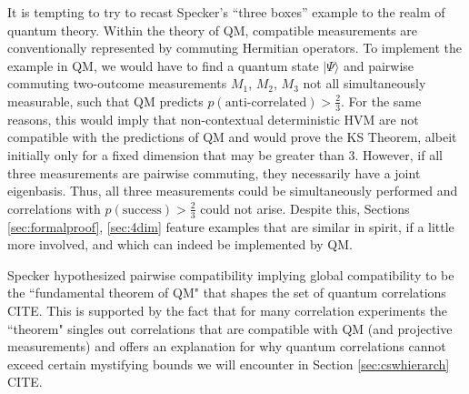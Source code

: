 It is tempting to try to recast Specker's “three boxes” example to the realm of quantum theory. Within the theory of QM, compatible measurements are conventionally represented by commuting Hermitian operators. To implement the example in QM, we would have to find a quantum state $|\Psi\rangle$ and pairwise commuting two-outcome measurements $M_{1}$, $M_{2}$, $M_{3}$ not all simultaneously measurable, such that QM predicts $p(\text{anti-correlated})>\frac{2}{3}$. For the same reasons, this would imply that non-contextual deterministic HVM are not compatible with the predictions of QM and would prove the KS Theorem, albeit initially only for a fixed dimension that may be greater than 3. However, if all three measurements are pairwise commuting, they necessarily have a joint eigenbasis. Thus, all three measurements could be simultaneously performed and correlations with $p(\text{success})>\frac{2}{3}$ could not arise. Despite this, Sections \ref{sec:formalproof}, \ref{sec:4dim} feature examples that are similar in spirit, if a little more involved, and which can indeed be implemented by QM.

Specker hypothesized pairwise compatibility implying global compatibility to be the ``fundamental theorem of QM" that shapes the set of quantum correlations CITE. This is supported by the fact that for many correlation experiments the ``theorem" singles out correlations that are compatible with QM (and projective measurements) and offers an explanation for why quantum correlations cannot exceed certain mystifying bounds we will encounter in Section \ref{sec:cswhierarch} CITE.


